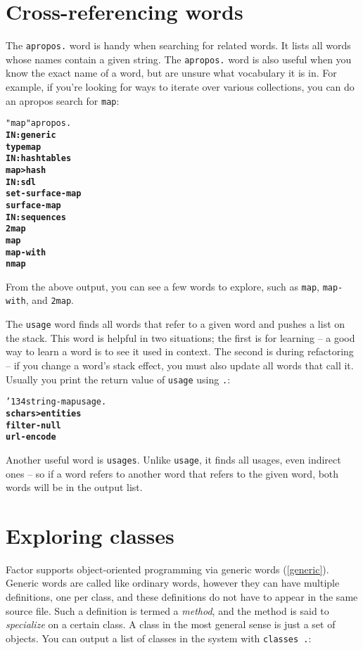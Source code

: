 \documentclass{book}
\newcommand{\bs}{\char'134}
\begin{document}
\section{Cross-referencing words}

The \texttt{apropos.} word is handy when searching for related words. It lists all words
whose names contain a given string. The \texttt{apropos.} word is also useful when you know the exact name of a word, but are unsure what vocabulary it is in. For example, if you're looking for ways to iterate over various collections, you can do an apropos search for \texttt{map}:

\begin{alltt}
  "map" apropos.
\textbf{IN: generic
typemap
IN: hashtables
map>hash
IN: sdl
set-surface-map
surface-map
IN: sequences
2map
map
map-with
nmap}
\end{alltt}

From the above output, you can see a few words to explore, such as \verb|map|, \verb|map-with|, and \verb|2map|.

The \texttt{usage} word finds all words that refer to a given word and pushes a list on the stack. This word is helpful in two situations; the first is for learning -- a good way to learn a word is to see it used in context. The second is during refactoring -- if you change a word's stack effect, you must also update all words that call it. Usually you print the
return value of \texttt{usage} using \texttt{.}:

\begin{alltt}
  \bs string-map usage .
\textbf{schars>entities
filter-null
url-encode}
\end{alltt}

Another useful word is \texttt{usages}. Unlike \texttt{usage}, it finds all usages, even
indirect ones -- so if a word refers to another word that refers to the given word,
both words will be in the output list.

\section{Exploring classes}

Factor supports object-oriented programming via generic words (\ref{generic}). Generic words are called
like ordinary words, however they can have multiple definitions, one per class, and
these definitions do not have to appear in the same source file. Such a definition is
termed a \emph{method}, and the method is said to \emph{specialize} on a certain
class. A class in the most
general sense is just a set of objects. You can output a list of classes in the system
with \texttt{classes .}:
\end{document}
